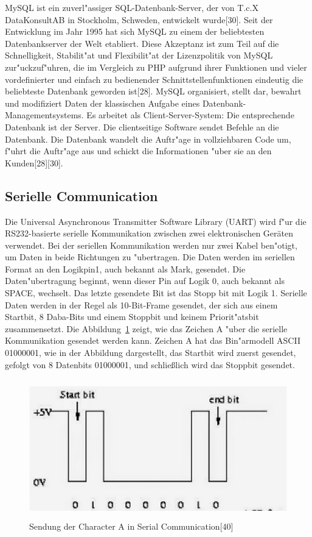 MySQL ist ein zuverl"assiger SQL-Datenbank-Server, 
der von T.c.X DataKonsultAB in Stockholm, Schweden, entwickelt wurde[30]. 
Seit der Entwicklung im Jahr 1995 hat sich MySQL zu einem der 
beliebtesten Datenbankserver der Welt etabliert. 
Diese Akzeptanz ist zum Teil auf die Schnelligkeit, 
Stabilit"at und Flexibilit"at der Lizenzpolitik von MySQL zur"uckzuf"uhren, 
die im Vergleich zu PHP aufgrund ihrer Funktionen und vieler 
vordefinierter und einfach zu bedienender Schnittstellenfunktionen 
eindeutig die beliebteste Datenbank geworden ist[28].
MySQL organisiert, stellt dar, bewahrt und modifiziert 
Daten der klassischen Aufgabe 
eines Datenbank-Managementsystems.
Es arbeitet als Client-Server-System: Die entsprechende Datenbank ist der Server.
 Die clientseitige Software sendet Befehle an die Datenbank. 
 Die Datenbank wandelt die Auftr"age in vollziehbaren Code um, 
 f"uhrt die Auftr"age aus und schickt die Informationen "uber sie an den Kunden[28][30].
 
\subsection{Serielle Communication}

Die Universal Asynchronous Transmitter Software Library (UART) wird 
f"ur die RS232-basierte serielle Kommunikation zwischen zwei 
elektronischen Geräten verwendet. Bei der seriellen Kommunikation werden 
nur zwei Kabel ben"otigt, um Daten in beide Richtungen zu "ubertragen. 
Die Daten werden im seriellen Format an den Logikpin1, auch bekannt als Mark, 
gesendet. Die Daten"ubertragung beginnt, wenn dieser Pin auf Logik 0,
 auch bekannt als SPACE, wechselt. Das letzte gesendete Bit ist das 
 Stopp bit mit Logik 1. Serielle Daten werden in der Regel als 10-Bit-Frame gesendet, 
 der sich aus einem Startbit, 8 Daba-Bits und einem Stoppbit und keinem Priorit"atsbit zusammensetzt.
Die Abbildung~\ref{fig:AS} zeigt, wie das Zeichen A "uber die serielle Kommunikation 
gesendet werden kann. Zeichen A hat das Bin"armodell ASCII 01000001,
 wie in der Abbildung dargestellt, das Startbit wird zuerst gesendet, 
 gefolgt von 8 Datenbits 01000001, und schließlich wird das Stoppbit  gesendet.




\begin{figure}[!htb]
\begin{center}
\includegraphics[height=6cm]{bilder/AS.eps}
\end{center}
\caption{Sendung der Character A in Serial Communication[40]}\label{fig:AS}
\end{figure}



